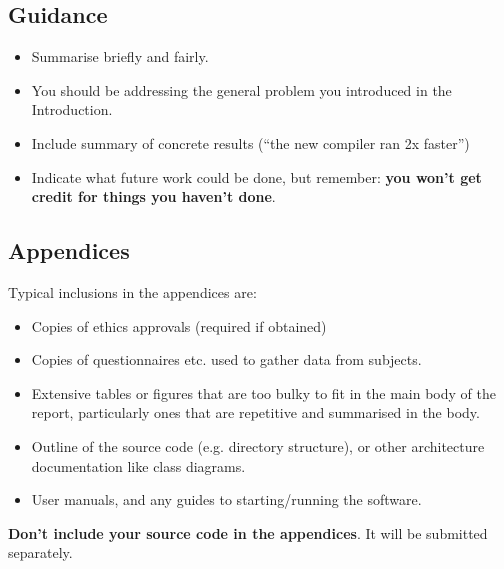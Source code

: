 \documentclass{l4proj}
\begin{document}
\section{Guidance}
\begin{itemize}
    \item
        Summarise briefly and fairly.
    \item
        You should be addressing the general problem you introduced in the
        Introduction.        
    \item
        Include summary of concrete results (``the new compiler ran 2x
        faster'')
    \item
        Indicate what future work could be done, but remember: \textbf{you
        won't get credit for things you haven't done}.
\end{itemize}

%
% 

\begin{appendices}

\chapter{Appendices}

Typical inclusions in the appendices are:

\begin{itemize}
\item
  Copies of ethics approvals (required if obtained)
\item
  Copies of questionnaires etc. used to gather data from subjects.
\item
  Extensive tables or figures that are too bulky to fit in the main body of
  the report, particularly ones that are repetitive and summarised in the body.

\item Outline of the source code (e.g. directory structure), or other architecture documentation like class diagrams.

\item User manuals, and any guides to starting/running the software.

\end{itemize}

\textbf{Don't include your source code in the appendices}. It will be
submitted separately.

\end{appendices}






\end{document}
